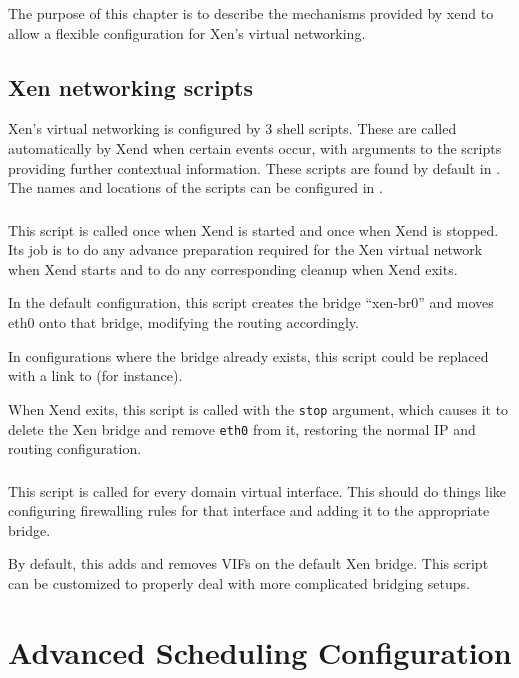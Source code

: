 \documentclass[11pt,twoside,final,openright]{xenstyle}
\begin{document}
{The purpose of this chapter is to describe the mechanisms provided by
xend to allow a flexible configuration for Xen's virtual networking.

\section{Xen networking scripts}

Xen's virtual networking is configured by 3 shell scripts.  These are
called automatically by Xend when certain events occur, with arguments
to the scripts providing further contextual information.  These
scripts are found by default in .  The names and
locations of the scripts can be configured in .

\subsection{}

This script is called once when Xend is started and once when Xend is
stopped.  Its job is to do any advance preparation required for the
Xen virtual network when Xend starts and to do any corresponding
cleanup when Xend exits.

In the default configuration, this script creates the bridge
``xen-br0'' and moves eth0 onto that bridge, modifying the routing
accordingly.

In configurations where the bridge already exists, this script could
be replaced with a link to  (for instance).

When Xend exits, this script is called with the {\tt stop} argument,
which causes it to delete the Xen bridge and remove {\tt eth0} from
it, restoring the normal IP and routing configuration.

\subsection{}

This script is called for every domain virtual interface.  This should
do things like configuring firewalling rules for that interface and
adding it to the appropriate bridge.

By default, this adds and removes VIFs on the default Xen bridge.
This script can be customized to properly deal with more complicated
bridging setups.

\chapter{Advanced Scheduling Configuration}

}
\end{document}
